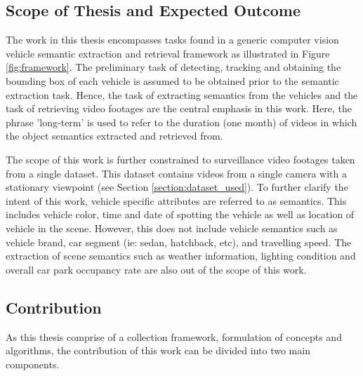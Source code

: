 \subsection{Scope of Thesis and Expected Outcome}
\label{subsec:scope}
The work in this thesis encompasses tasks found in a generic computer vision vehicle semantic extraction and retrieval framework as illustrated in Figure \ref{fig:framework}. The preliminary task of detecting, tracking and obtaining the bounding box of each vehicle is assumed to be obtained prior to the semantic extraction task. Hence, the task of extracting semantics from the vehicles and the task of retrieving video footages are the central emphasis in this work. Here, the phrase 'long-term' is used to refer to the duration (one month) of videos in which the object semantics extracted and retrieved from. 

The scope of this work is further constrained to surveillance video footages taken from a single dataset. This dataset contains videos from a single camera with a stationary viewpoint (see Section \ref{section:dataset_used}). To further clarify the intent of this work, vehicle specific attributes are referred to as semantics. This includes vehicle color, time and date of spotting the vehicle as well as location of vehicle in the scene. However, this does not include vehicle semantics such as vehicle brand, car segment (ie: sedan, hatchback, etc), and travelling speed. The extraction of scene semantics such as weather information, lighting condition and overall car park occupancy rate are also out of the scope of this work.



\subsection{Contribution}
As this thesis comprise of a collection framework, formulation of concepts and algorithms, the contribution of this work can be divided into two main components. 

